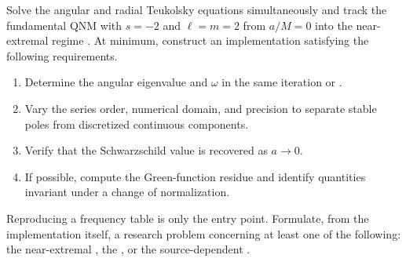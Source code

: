 \begin{researchproblem}
Solve the angular and radial Teukolsky equations simultaneously and track the fundamental QNM with $s=-2$ and $\ell=m=2$ from $a/M=0$ into the near-extremal regime \cite{Teukolsky:1972my,Leaver:1985ax}. At minimum, construct an implementation satisfying the following requirements.

\begin{enumerate}[label=(\roman*),leftmargin=2.8em]
\item Determine the angular eigenvalue and $\omega$ in the same iteration or .
\item Vary the series order, numerical domain, and precision to separate stable poles from discretized continuous components.
\item Verify that the Schwarzschild value is recovered as $a\to0$.
\item If possible, compute the Green-function residue and identify quantities invariant under a change of normalization.
\end{enumerate}

Reproducing a frequency table is only the entry point. Formulate, from the implementation itself, a research problem concerning at least one of the following: the near-extremal , the , or the source-dependent .
\end{researchproblem}
